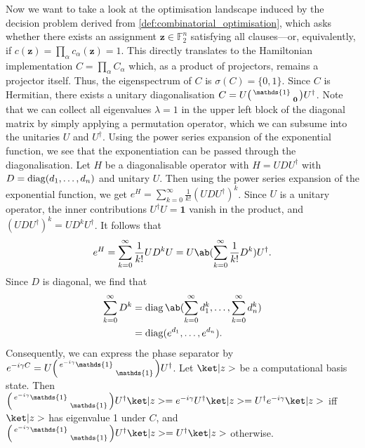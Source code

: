 Now we want to take a look at the optimisation landscape induced by the decision problem derived from \cref{def:combinatorial_optimisation}, which asks whether there exists an assignment $\bm{z} \in \mathds{F}_2^n$ satisfying all clauses---or, equivalently, if $c(\bm{z}) = \prod_{\alpha} c_\alpha(\bm{z}) = 1$. This directly translates to the Hamiltonian implementation $C = \prod_\alpha C_\alpha$ which, as a product of projectors, remains a projector itself. Thus, the eigenspectrum of $C$ is $\sigma(C) = \{0,1\}$. Since $C$ is Hermitian, there exists a unitary diagonalisation $C = U \begin{psmallmatrix} \mathds{1} &  \\ & \bm{0}  \end{psmallmatrix} U^\dag$. Note that we can collect all eigenvalues $\lambda = 1$ in the upper left block of the diagonal matrix by simply applying a permutation operator, which we can subsume into the unitaries $U$ and $U^\dagger$. Using the power series expansion of the exponential function, we see that the exponentiation can be passed through the diagonalisation. Let $H$ be a diagonalisable operator with $H = U D U^\dagger$ with $D = \operatorname*{diag} (d_1, \dots, d_n)$ and unitary $U$. Then using the power series expansion of the exponential function, we get $e^H = \sum_{k = 0}^\infty \frac{1}{k!} (U D U^\dagger)^k$. Since $U$ is a unitary operator, the inner contributions $U^\dagger U=\bm{1}$ vanish in the product, and $(U D U^\dagger)^k = U D^k U^\dagger$. It follows that 
% 
\begin{equation}
e^H = \sum_{k = 0}^\infty \frac{1}{k!} U D^k U = U \ab(\sum_{k = 0}^\infty \frac{1}{k!} D^k) U^\dagger. 
\end{equation}
%
Since $D$ is diagonal, we find that
%
\begin{equation}
\begin{aligned}
    \sum_{k = 0}^\infty D^k &= \diag \ab(\sum_{k = 0}^\infty d_1^k, \dots, \sum_{k = 0}^\infty d_n^k) \\
                            &= \diag(e^{d_1}, \dots, e^{d_n}).
\end{aligned}
\end{equation}
%
Consequently, we can express the phase separator by \(e^{-i \pangle C} = U \begin{psmallmatrix} e^{-i \pangle} \mathds{1} & \\ & \mathds{1} \end{psmallmatrix} U^\dag\).
%
Let $\ket|z>$ be a computational basis state. Then
\(\begin{psmallmatrix} e^{-i \pangle} \mathds{1} & \\ & \mathds{1} \end{psmallmatrix} U^\dag \ket|z> = e^{-i \pangle} U^\dag \ket|z> = U^\dag e^{-i \pangle} \ket|z>\) iff $\ket|z>$ has eigenvalue 1 under $C$, and \(\begin{psmallmatrix} e^{-i \pangle} \mathds{1} & \\ & \mathds{1} \end{psmallmatrix} U^\dag \ket|z> = U^\dag \ket|z>  \) otherwise.
